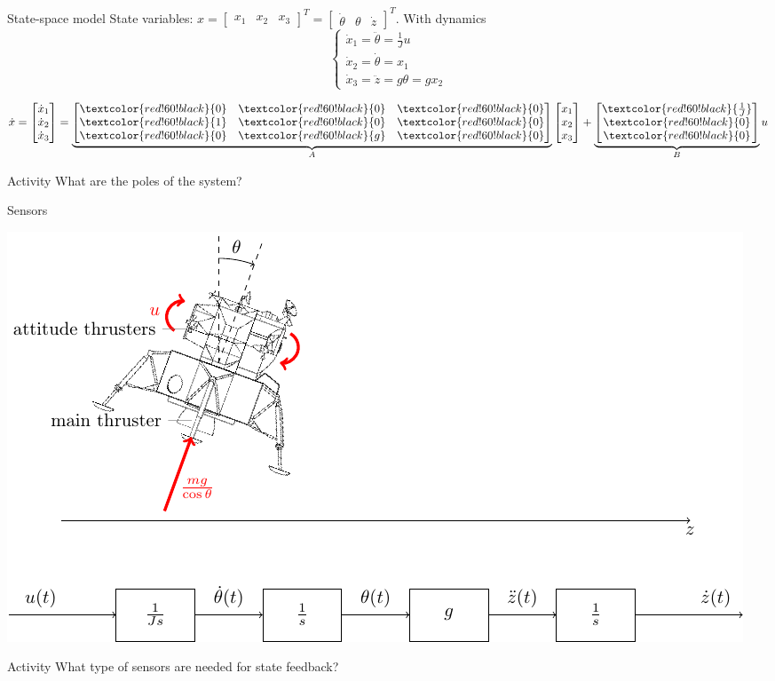 \documentclass[presentation,aspectratio=169]{beamer}
\begin{document}
\begin{frame}[label={sec:orgc7723a6}]{State-space model}
State variables: \(x = \begin{bmatrix} x_1 & x_2 & x_3 \end{bmatrix}^T = \begin{bmatrix} \dot{\theta} & \theta & \dot{z} \end{bmatrix}^T\). With dynamics
\[ \begin{cases} \dot{x}_1 =  \ddot{\theta} = \frac{1}{J} u\\ \dot{x}_2 = \dot{\theta} = x_1\\ \dot{x}_3 = \ddot{z} = g\theta = gx_2 \end{cases} \]

\[ \dot{x} = \begin{bmatrix} \dot{x}_1\\\dot{x}_2\\\dot{x}_3\end{bmatrix} = \underbrace{\begin{bmatrix} \textcolor{red!60!black}{0} & \textcolor{red!60!black}{0} &\textcolor{red!60!black}{0} \\\textcolor{red!60!black}{1} & \textcolor{red!60!black}{0}& \textcolor{red!60!black}{0}\\ \textcolor{red!60!black}{0}& \textcolor{red!60!black}{g} &\textcolor{red!60!black}{0} \end{bmatrix}}_{A} \begin{bmatrix} x_1\\x_2\\x_3\end{bmatrix} + \underbrace{\begin{bmatrix} \textcolor{red!60!black}{\frac{1}{J}} \\ \textcolor{red!60!black}{0} \\\textcolor{red!60!black}{0}  \end{bmatrix}}_{B} u \]

\pause

\alert{Activity} What are the poles of the system?
\end{frame}

\begin{frame}[label={sec:orge51059f}]{Sensors}
\begin{center}
\includegraphics[width=0.8\linewidth]{../../figures/fig-apollo}
\end{center}
\alert{Activity} What type of sensors are needed for state feedback?
\end{frame}
\end{document}
